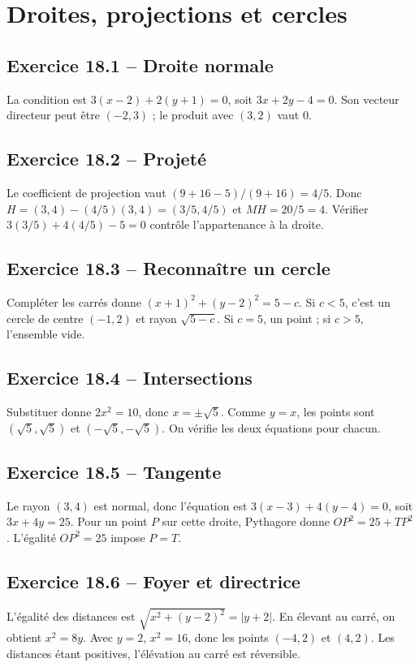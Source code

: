 \chapter{Droites, projections et cercles}
\section*{Exercice 18.1 -- Droite normale}
La condition est $3(x-2)+2(y+1)=0$, soit $3x+2y-4=0$. Son vecteur directeur peut être $(-2,3)$ ; le produit avec $(3,2)$ vaut $0$.

\section*{Exercice 18.2 -- Projeté}
Le coefficient de projection vaut $(9+16-5)/(9+16)=4/5$. Donc $H=(3,4)-(4/5)(3,4)=(3/5,4/5)$ et $MH=20/5=4$. Vérifier $3(3/5)+4(4/5)-5=0$ contrôle l'appartenance à la droite.

\section*{Exercice 18.3 -- Reconnaître un cercle}
Compléter les carrés donne $(x+1)^2+(y-2)^2=5-c$. Si $c<5$, c'est un cercle de centre $(-1,2)$ et rayon $\sqrt{5-c}$. Si $c=5$, un point ; si $c>5$, l'ensemble vide.

\section*{Exercice 18.4 -- Intersections}
Substituer donne $2x^2=10$, donc $x=\pm\sqrt5$. Comme $y=x$, les points sont $(\sqrt5,\sqrt5)$ et $(-\sqrt5,-\sqrt5)$. On vérifie les deux équations pour chacun.

\section*{Exercice 18.5 -- Tangente}
Le rayon $(3,4)$ est normal, donc l'équation est $3(x-3)+4(y-4)=0$, soit $3x+4y=25$. Pour un point $P$ sur cette droite, Pythagore donne $OP^2=25+TP^2$. L'égalité $OP^2=25$ impose $P=T$.

\section*{Exercice 18.6 -- Foyer et directrice}
L'égalité des distances est $\sqrt{x^2+(y-2)^2}=|y+2|$. En élevant au carré, on obtient $x^2=8y$. Avec $y=2$, $x^2=16$, donc les points $(-4,2)$ et $(4,2)$. Les distances étant positives, l'élévation au carré est réversible.
